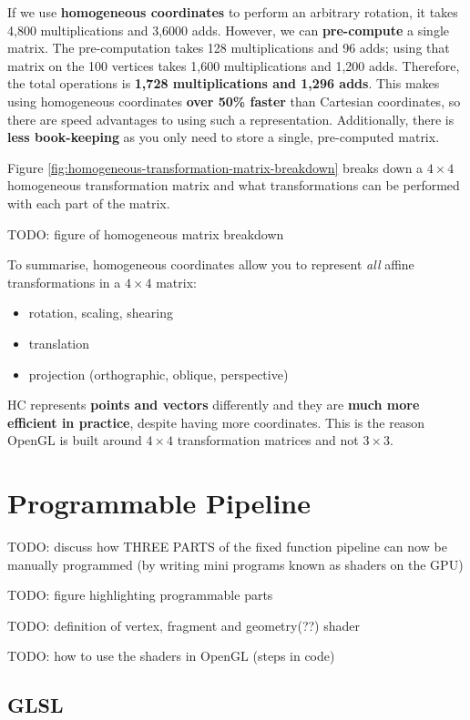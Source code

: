 \documentclass{article}
\begin{document}
If we use \textbf{homogeneous coordinates} to perform an arbitrary rotation, it takes 4,800 multiplications and 3,6000 adds. However, we can \textbf{pre-compute} a single matrix. The pre-computation takes 128 multiplications and 96 adds; using that matrix on the 100 vertices takes 1,600 multiplications and 1,200 adds. Therefore, the total operations is \textbf{1,728 multiplications and 1,296 adds}. This makes using homogeneous coordinates \textbf{over 50\% faster} than Cartesian coordinates, so there are speed advantages to using such a representation. Additionally, there is \textbf{less book-keeping} as you only need to store a single, pre-computed matrix.

Figure \ref{fig:homogeneous-transformation-matrix-breakdown} breaks down a $4 \times 4$ homogeneous transformation matrix and what transformations can be performed with each part of the matrix.

TODO: figure of homogeneous matrix breakdown

To summarise, homogeneous coordinates allow you to represent \textit{all} affine transformations in a $4 \times 4$ matrix:
\begin{itemize}
	\item rotation, scaling, shearing
	\item translation
	\item projection (orthographic, oblique, perspective)
\end{itemize}
HC represents \textbf{points and vectors} differently and they are \textbf{much more efficient in practice}, despite having more coordinates. This is the reason OpenGL is built around $4 \times 4$ transformation matrices and not $3 \times 3$.

\section{Programmable Pipeline}

TODO: discuss how THREE PARTS of the fixed function pipeline can now be manually programmed (by writing mini programs known as shaders on the GPU)

TODO: figure highlighting programmable parts

TODO: definition of vertex, fragment and geometry(??) shader

TODO: how to use the shaders in OpenGL (steps in code)

\subsection{GLSL}
\end{document}

